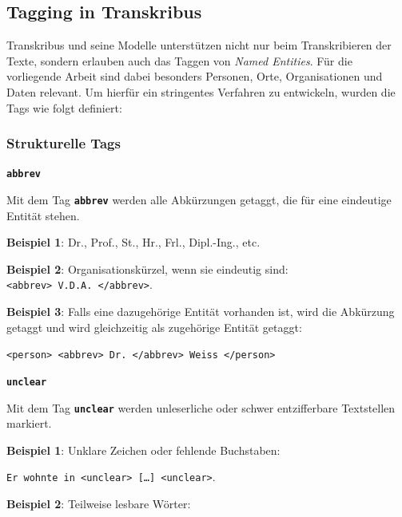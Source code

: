 \documentclass[12pt, a4paper, ngerman, bidi=default]{article}
\newcommand{\code}[1]{\colorbox{VeryLightGray}{\texttt{#1}}} %
\begin{document}
\subsection{Tagging in Transkribus}


    Transkribus und seine Modelle unterstützen nicht nur beim Transkribieren der Texte, sondern erlauben auch das Taggen von \textit{Named Entities}.  
    Für die vorliegende Arbeit sind dabei besonders Personen, Orte, Organisationen und Daten relevant.  
    Um hierfür ein stringentes Verfahren zu entwickeln, wurden die Tags wie folgt definiert:
  
\subsubsection{Strukturelle Tags}
    \begin{description}

    \item\texttt{\textbf{{\colorbox{abbrev}{abbrev}}}}
    
        
    Mit dem Tag \texttt{\texttt{\textbf{{\colorbox{abbrev}{abbrev}}}}} werden alle Abkürzungen getaggt, die für eine eindeutige Entität stehen.

    
    \noindent\textbf{ Beispiel 1}: Dr., Prof., St., Hr., Frl., Dipl.-Ing., etc.

    \textbf{ Beispiel 2}: Organisationskürzel, wenn sie eindeutig sind:\\\code{<abbrev>~V.D.A.~</abbrev>}.

    \textbf{\textbf{ Beispiel 3}}: Falls eine dazugehörige Entität vorhanden ist, wird die Abkürzung getaggt und wird gleichzeitig als zugehörige Entität getaggt:

    \code{<person>~<abbrev>~Dr.~</abbrev>~Weiss~</person>}
    
    \item\texttt{\textbf{{\colorbox{unclear}{unclear}}}}
    

    Mit dem Tag \texttt{\texttt{\textbf{{\colorbox{unclear}{unclear}}}}} werden unleserliche oder schwer entzifferbare Textstellen markiert.
    
    \noindent\textbf{ Beispiel 1}: Unklare Zeichen oder fehlende Buchstaben: 

    \code{Er wohnte in~<unclear>~[\ldots]~<unclear>}.

    \textbf{ Beispiel 2}: Teilweise lesbare Wörter:


\end{description}
\end{document}
